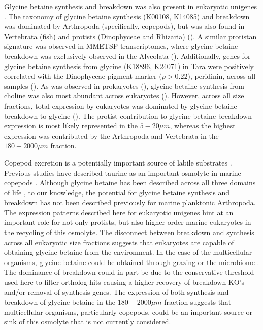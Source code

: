 \documentclass[utf8]{frontiersSCNS} %
\providecommand{\DIFaddtex}[1]{{\protect\color{blue}\uwave{#1}}} %
\providecommand{\DIFdeltex}[1]{{\protect\color{red}\sout{#1}}}                      %
\providecommand{\DIFaddbegin}{} %
\providecommand{\DIFaddend}{} %
\providecommand{\DIFdelbegin}{} %
\providecommand{\DIFdelend}{} %
\providecommand{\DIFadd}[1]{\texorpdfstring{\DIFaddtex{#1}}{#1}} %
\providecommand{\DIFdel}[1]{\texorpdfstring{\DIFdeltex{#1}}{}} %
\begin{document}
Glycine betaine synthesis and breakdown was also present in eukaryotic unigenes \citep{Carradec2018}. The taxonomy of glycine betaine synthesis (K00108, K14085) and breakdown was dominated by Arthropoda (specifically, copepods), but was also found in Vertebrata (fish) and protists (Dinophyceae and Rhizaria) (). A similar protistan signature was observed in MMETSP transcriptomes, where  glycine betaine breakdown was exclusively observed in the Alveolata (). Additionally, genes for glycine betaine synthesis from glycine (K18896, K24071) in Tara were positively correlated with the Dinophyceae pigment marker ($\rho > 0.22$), peridinin, across all samples (). As was observed in prokaryotes (), glycine betaine synthesis from choline was also most abundant across eukaryotes (). However, across all size fractions, total expression by eukaryotes was dominated by glycine betaine breakdown to glycine (). The protist contribution to glycine betaine breakdown expression is most likely represented in the $5-20\mu m$, whereas the highest expression was contributed by the Arthropoda and Vertebrata in the $180-2000\mu m$ fraction.

Copepod excretion is a potentially important source of labile substrates \citep{Maas2020}. Previous studies have described taurine as an important osmolyte in marine copepods \citep{Clifford2020}. Although glycine betaine has been described across all three domains of life \citep{Yancey2005}, to our knowledge, the potential for glycine betaine synthesis and breakdown has not been described previously for marine planktonic Arthropoda. The expression patterns described here for eukaryotic unigenes hint at an important role for not only protists, but also higher-order marine eukaryotes in the recycling of this osmolyte. The disconnect between breakdown and synthesis across all eukaryotic size fractions suggests that eukaryotes are capable of obtaining glycine betaine from the environment. In the case of \DIFdelbegin \DIFdel{the }\DIFdelend multicellular organisms, glycine betaine could be obtained through grazing or the microbiome \citep{Shoemaker2017}. The dominance of breakdown could in part be due to the conservative threshold used here to filter ortholog hits causing a higher recovery of breakdown \DIFdelbegin \DIFdel{KO's }\DIFdelend \DIFaddbegin \DIFadd{KOs }\DIFaddend and/or removal of synthesis genes. The expression of both synthesis and breakdown of glycine betaine in the $180-2000 \mu m$ fraction suggests that multicellular organisms, particularly copepods, could be an important source or sink of this osmolyte that is not currently considered.
\end{document}

